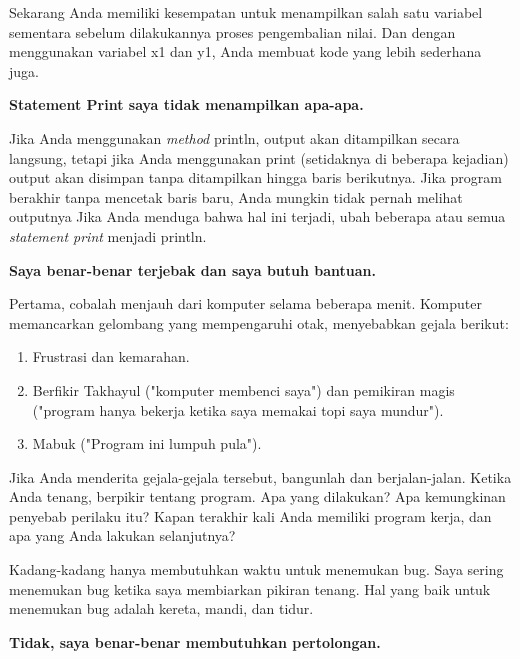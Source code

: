 \noindent Sekarang Anda memiliki kesempatan untuk menampilkan salah satu variabel sementara sebelum dilakukannya proses pengembalian nilai. Dan dengan menggunakan variabel x1 dan y1, Anda membuat kode yang lebih sederhana juga.

\noindent \textbf{Statement Print saya tidak menampilkan apa-apa.}

\noindent Jika Anda menggunakan \textit{method} println, output akan ditampilkan secara langsung, tetapi jika Anda menggunakan print (setidaknya di beberapa kejadian) output akan disimpan tanpa ditampilkan hingga baris berikutnya. Jika program berakhir tanpa mencetak baris baru, Anda mungkin tidak pernah melihat outputnya
Jika Anda menduga bahwa hal ini terjadi, ubah beberapa atau semua \textit{statement print} menjadi println.

\noindent \textbf{Saya benar-benar terjebak dan saya butuh bantuan.}

\noindent Pertama, cobalah menjauh dari komputer selama beberapa menit. Komputer memancarkan gelombang yang mempengaruhi otak, menyebabkan gejala berikut:
\begin{enumerate}
    \item Frustrasi dan kemarahan.
    \item Berfikir Takhayul ("komputer membenci saya") dan pemikiran magis ("program hanya bekerja ketika saya memakai topi saya mundur").
    \item Mabuk ("Program ini lumpuh pula").
\end{enumerate}

\noindent Jika Anda menderita gejala-gejala tersebut, bangunlah dan berjalan-jalan. Ketika Anda tenang, berpikir tentang program. Apa yang dilakukan? Apa kemungkinan penyebab perilaku itu? Kapan terakhir kali Anda memiliki program kerja, dan apa yang Anda lakukan selanjutnya?

\noindent Kadang-kadang hanya membutuhkan waktu untuk menemukan bug. Saya sering menemukan bug ketika saya membiarkan pikiran tenang. Hal yang baik untuk menemukan bug adalah kereta, mandi, dan tidur.

\noindent \textbf{Tidak, saya benar-benar membutuhkan pertolongan.}

